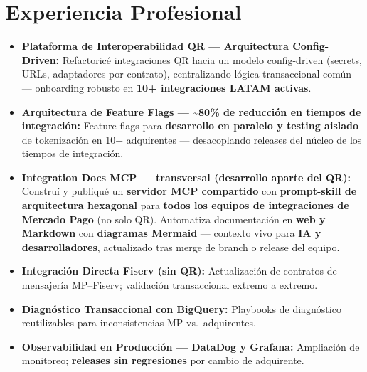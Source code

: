 \section*{Experiencia Profesional}


\begin{itemize}
  \item \textbf{Plataforma de Interoperabilidad QR — Arquitectura Config-Driven:}
        Refactoricé integraciones QR hacia un modelo config-driven (secrets, URLs, adaptadores por contrato),
        centralizando lógica transaccional común — onboarding robusto en \textbf{10+ integraciones LATAM activas}.

  \item \textbf{Arquitectura de Feature Flags — \textasciitilde{}80\% de reducción en tiempos de integración:}
        Feature flags para \textbf{desarrollo en paralelo y testing aislado} de tokenización en 10+
        adquirentes — desacoplando releases del núcleo de los tiempos de integración.

  \item \textbf{Integration Docs MCP — transversal (desarrollo aparte del QR):}
        Construí y publiqué un \textbf{servidor MCP compartido} con \textbf{prompt-skill de arquitectura
        hexagonal} para \textbf{todos los equipos de integraciones de Mercado Pago} (no solo QR).
        Automatiza documentación en \textbf{web y Markdown} con \textbf{diagramas Mermaid} — contexto vivo
        para \textbf{IA y desarrolladores}, actualizado tras merge de branch o release del equipo.

  \item \textbf{Integración Directa Fiserv (sin QR):}
        Actualización de contratos de mensajería MP–Fiserv; validación transaccional extremo a extremo.

  \item \textbf{Diagnóstico Transaccional con BigQuery:}
        Playbooks de diagnóstico reutilizables para inconsistencias MP vs.\ adquirentes.

  \item \textbf{Observabilidad en Producción — DataDog y Grafana:}
        Ampliación de monitoreo; \textbf{releases sin regresiones} por cambio de adquirente.
\end{itemize}

\vspace{4pt}

